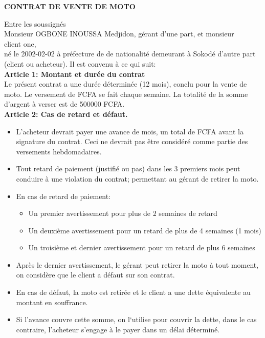 \documentclass[12pt]{article}
\begin{document}
\begin{center}
\fontsize{12}{14}\selectfont
\textbf{\MakeUppercase{Contrat de Vente de Moto}}
\end{center}

\noindent Entre les soussignés \\
Monsieur OGBONE INOUSSA Medjidon, gérant d’une part, et monsieur \\
client one,\\
né le 2002-02-02 à \underline{\hspace{5cm}} préfecture de \underline{\hspace{5cm}} de nationalité \underline{\hspace{5cm}} demeurant à Sokodé d’autre part (client ou acheteur). Il est convenu à ce qui suit:\\


\textbf{Article 1: Montant et durée du contrat} \\
Le présent contrat a une durée déterminée (12 mois), conclu pour la vente de moto. Le versement de \underline{\hspace{5cm}} FCFA se fait chaque semaine. La totalité de la somme d'argent à verser est de 500000 FCFA.\\


\textbf{Article 2: Cas de retard et défaut.} 
\begin{itemize}
	\item[A.]L’acheteur devrait payer une avance de \underline{\hspace{2cm}} mois, un total de \underline{\hspace{5cm}} FCFA avant la signature du contrat. Ceci ne devrait pas être considéré comme partie des versements hebdomadaires.
	\item[B.]Tout retard de paiement (justifié ou pas) dans les 3 premiers mois peut conduire à une violation du contrat; permettant au gérant de retirer la moto. 
	\item[C.]En cas de retard de paiement: 
		\begin{itemize}
			\item[a.]Un premier avertissement pour plus de 2 semaines de retard 
			\item[b.]Un deuxième avertissement pour un retard de plus de 4 semaines (1 mois) 
			\item[c.]Un troisième et dernier avertissement pour un retard de plus 6 semaines 
		\end{itemize}
	\item[D.] Après le dernier avertissement, le gérant peut retirer la moto à tout moment, on considère que le client a défaut sur son contrat. 
	\item[E.]En cas de défaut, la moto est retirée et le client a une dette équivalente au montant en souffrance.
	\item[F.]Si l’avance couvre cette somme, on l‘utilise pour couvrir la dette, dans le cas contraire, l’acheteur s'engage à le payer dans un délai déterminé.
\end{itemize}
\end{document}
